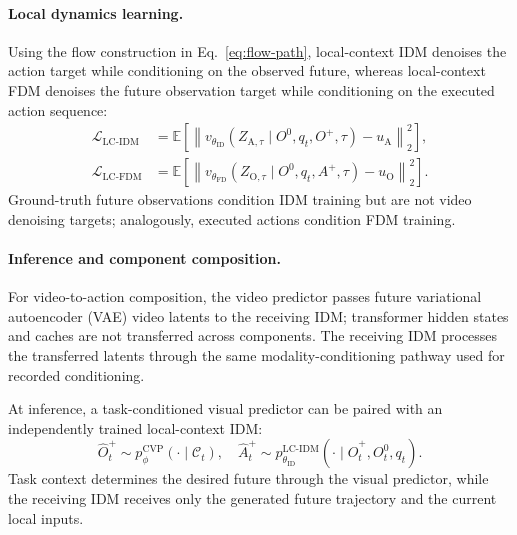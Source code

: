 \paragraph{Local dynamics learning.}
Using the flow construction in Eq.~\ref{eq:flow-path}, local-context IDM denoises
the action target while conditioning on the observed future, whereas local-context
FDM denoises the future observation target while conditioning on the
executed action sequence:
\begin{equation}
\begin{aligned}
\mathcal L_{\mathrm{LC\text{-}IDM}}
&=
\mathbb E\!\left[
\left\|
v_{\theta_{\mathrm{ID}}}
(
Z_{\mathrm A,\tau}
\mid
 O^0,q_t, O^+,\tau
)
-u_{\mathrm A}
\right\|_2^2
\right],\\
\mathcal L_{\mathrm{LC\text{-}FDM}}
&=
\mathbb E\!\left[
\left\|
v_{\theta_{\mathrm{FD}}}
(
Z_{\mathrm O,\tau}
\mid
 O^0,q_t, A^+,\tau
)
-u_{\mathrm O}
\right\|_2^2
\right].
\end{aligned}
\label{eq:strict-dynamics-objectives}
\end{equation}
Ground-truth future observations condition IDM training but are not video
denoising targets; analogously, executed actions condition FDM training.


\paragraph{Inference and component composition.}


For video-to-action composition, the video predictor passes future
variational autoencoder (VAE) video latents to the receiving IDM;
transformer hidden states and caches are not transferred across components.
The receiving IDM processes the transferred latents through the same
modality-conditioning pathway used for recorded conditioning.

At inference, a task-conditioned visual predictor can be paired with an
independently trained local-context IDM:
\begin{equation}
\hat{O}_t^+ \sim p_\phi^{\mathrm{CVP}}(\cdot\mid\mathcal C_t),
\quad
\hat{A}_t^+ \sim p_{\theta_{\mathrm{ID}}}^{\mathrm{LC\text{-}IDM}}
(\cdot\mid \hat{O}_t^+, O_t^0, q_t).
\label{eq:strict-vta-composition}
\end{equation}
Task context determines the desired future through the visual predictor,
while the receiving IDM receives only the generated future trajectory and the
current local inputs.

